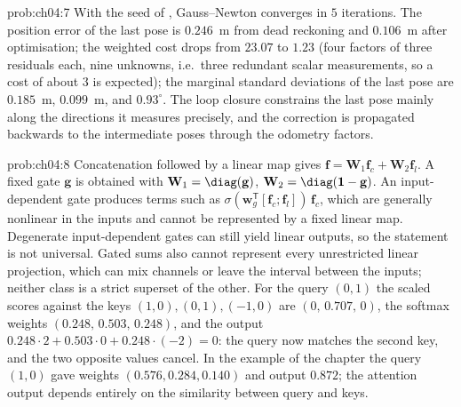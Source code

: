 \begin{sol}{prob:ch04:7}
With the seed of , Gauss--Newton converges in $5$ iterations. The position error of the last pose is $0.246$~m from dead reckoning and $0.106$~m after optimisation; the weighted cost drops from $23.07$ to $1.23$ (four factors of three residuals each, nine unknowns, i.e.\ three redundant scalar measurements, so a cost of about $3$ is expected); the marginal standard deviations of the last pose are $0.185$~m, $0.099$~m, and $0.93^{\circ}$. The loop closure constrains the last pose mainly along the directions it measures precisely, and the correction is propagated backwards to the intermediate poses through the odometry factors.
\end{sol}
\begin{sol}{prob:ch04:8}
Concatenation followed by a linear map gives $\mathbf{f}=\mathbf{W}_1\mathbf{f}_c+\mathbf{W}_2\mathbf{f}_l$. A fixed gate $\mathbf{g}$ is obtained with $\mathbf{W}_1=\diag(\mathbf{g})$, $\mathbf{W}_2=\diag(\mathbf{1}-\mathbf{g})$. An input-dependent gate produces terms such as $\sigma(\mathbf{w}_g^{\mathsf T}[\mathbf{f}_c;\mathbf{f}_l])\,\mathbf{f}_c$, which are generally nonlinear in the inputs and cannot be represented by a fixed linear map. Degenerate input-dependent gates can still yield linear outputs, so the statement is not universal. Gated sums also cannot represent every unrestricted linear projection, which can mix channels or leave the interval between the inputs; neither class is a strict superset of the other. For the query $(0,1)$ the scaled scores against the keys $(1,0),(0,1),(-1,0)$ are $(0,\,0.707,\,0)$, the softmax weights $(0.248,\,0.503,\,0.248)$, and the output $0.248\cdot2+0.503\cdot0+0.248\cdot(-2)=0$: the query now matches the second key, and the two opposite values cancel. In the example of the chapter the query $(1,0)$ gave weights $(0.576,0.284,0.140)$ and output $0.872$; the attention output depends entirely on the similarity between query and keys.
\end{sol}
